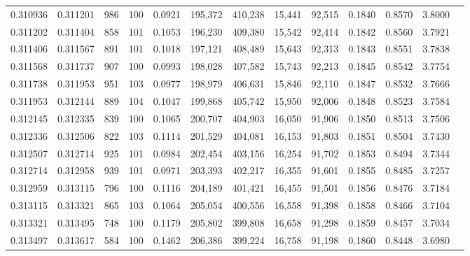 \begin{tabular}{rrrrrrrrrrrrr}
0.310936 & 0.311201 &   986 & 100 &                                     0.0921 & 195,372 & 410,238 &  15,441 &  92,515 & 0.1840 & 0.8570 & 3.8000 \\
0.311202 & 0.311404 &   858 & 101 &                                     0.1053 & 196,230 & 409,380 &  15,542 &  92,414 & 0.1842 & 0.8560 & 3.7921 \\
0.311406 & 0.311567 &   891 & 101 &                                     0.1018 & 197,121 & 408,489 &  15,643 &  92,313 & 0.1843 & 0.8551 & 3.7838 \\
0.311568 & 0.311737 &   907 & 100 &                                     0.0993 & 198,028 & 407,582 &  15,743 &  92,213 & 0.1845 & 0.8542 & 3.7754 \\
0.311738 & 0.311953 &   951 & 103 &                                     0.0977 & 198,979 & 406,631 &  15,846 &  92,110 & 0.1847 & 0.8532 & 3.7666 \\
0.311953 & 0.312144 &   889 & 104 &                                     0.1047 & 199,868 & 405,742 &  15,950 &  92,006 & 0.1848 & 0.8523 & 3.7584 \\
0.312145 & 0.312335 &   839 & 100 &                                     0.1065 & 200,707 & 404,903 &  16,050 &  91,906 & 0.1850 & 0.8513 & 3.7506 \\
0.312336 & 0.312506 &   822 & 103 &                                     0.1114 & 201,529 & 404,081 &  16,153 &  91,803 & 0.1851 & 0.8504 & 3.7430 \\
0.312507 & 0.312714 &   925 & 101 &                                     0.0984 & 202,454 & 403,156 &  16,254 &  91,702 & 0.1853 & 0.8494 & 3.7344 \\
0.312714 & 0.312958 &   939 & 101 &                                     0.0971 & 203,393 & 402,217 &  16,355 &  91,601 & 0.1855 & 0.8485 & 3.7257 \\
0.312959 & 0.313115 &   796 & 100 &                                     0.1116 & 204,189 & 401,421 &  16,455 &  91,501 & 0.1856 & 0.8476 & 3.7184 \\
0.313115 & 0.313321 &   865 & 103 &                                     0.1064 & 205,054 & 400,556 &  16,558 &  91,398 & 0.1858 & 0.8466 & 3.7104 \\
0.313321 & 0.313495 &   748 & 100 &                                     0.1179 & 205,802 & 399,808 &  16,658 &  91,298 & 0.1859 & 0.8457 & 3.7034 \\
0.313497 & 0.313617 &   584 & 100 &                                     0.1462 & 206,386 & 399,224 &  16,758 &  91,198 & 0.1860 & 0.8448 & 3.6980 \\

\end{tabular}
